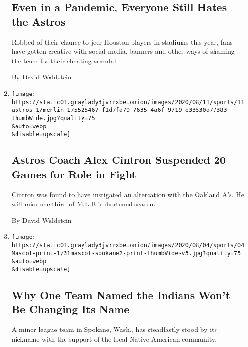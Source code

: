 \begin{enumerate}
  \hypertarget{even-in-a-pandemic-everyone-still-hates-the-astros}{%
  \subsection{Even in a Pandemic, Everyone Still Hates the
  Astros}\label{even-in-a-pandemic-everyone-still-hates-the-astros}}

  Robbed of their chance to jeer Houston players in stadiums this year,
  fans have gotten creative with social media, banners and other ways of
  shaming the team for their cheating scandal.

  By David Waldstein
\item
  \href{/2020/08/11/sports/baseball/alex-cintron-astros-suspended.html}{}

  \texttt{[image: https://static01.graylady3jvrrxbe.onion/images/2020/08/11/sports/11astros-1/merlin\_175525467\_f1d7fa79-7635-4a6f-9719-e33530a77383-thumbWide.jpg?quality=75\\\&auto=webp\\\&disable=upscale]}

  \hypertarget{astros-coach-alex-cintron-suspended-20-games-for-role-in-fight}{%
  \subsection{Astros Coach Alex Cintron Suspended 20 Games for Role in
  Fight}\label{astros-coach-alex-cintron-suspended-20-games-for-role-in-fight}}

  Cintron was found to have instigated an altercation with the Oakland
  A's. He will miss one third of M.L.B.'s shortened season.

  By David Waldstein
\item
  \href{/2020/08/03/sports/baseball/indians-team-names-mascots.html}{}

  \texttt{[image: https://static01.graylady3jvrrxbe.onion/images/2020/08/04/sports/04Mascot-print-1/31mascot-spokane2-print-thumbWide-v3.jpg?quality=75\\\&auto=webp\\\&disable=upscale]}

  \hypertarget{why-one-team-named-the-indians-wont-be-changing-its-name}{%
  \subsection{Why One Team Named the Indians Won't Be Changing Its
  Name}\label{why-one-team-named-the-indians-wont-be-changing-its-name}}

  A minor league team in Spokane, Wash., has steadfastly stood by its
  nickname with the support of the local Native American community.


\end{enumerate}
